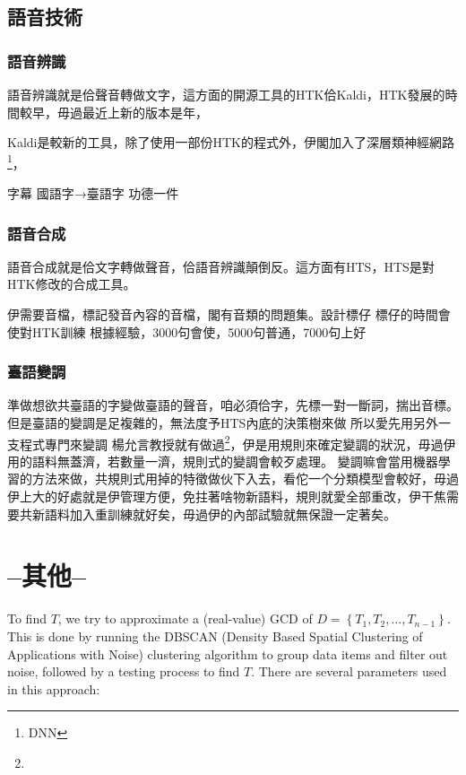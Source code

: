 \documentclass[final,oneside,onecolumn,12pt,a4paper]{book}%
\begin{document}
\section{語音技術}
\label{節：語音技術}
\subsection{語音辨識}
\label{節：語音辨識}
語音辨識就是佮聲音轉做文字，這方面的開源工具的HTK佮Kaldi，HTK發展的時間較早，毋過最近上新的版本是年，

Kaldi是較新的工具，除了使用一部份HTK的程式外，伊閣加入了深層類神經網路\footnote{DNN}，

字幕 國語字→臺語字
功德一件

\subsection{語音合成}
\label{節：語音合成}
語音合成就是佮文字轉做聲音，佮語音辨識顛倒反。這方面有HTS，HTS是對HTK修改的合成工具。

伊需要音檔，標記發音內容的音檔，閣有音類的問題集。設計標仔
標仔的時間會使對HTK訓練
根據經驗，3000句會使，5000句普通，7000句上好

\subsection{臺語變調}
\label{節：臺語變調}
準做想欲共臺語的字變做臺語的聲音，咱必須佮字，先標一對一斷詞，揣出音標。
但是臺語的變調是足複雜的，無法度予HTS內底的決策樹來做
所以愛先用另外一支程式專門來變調
楊允言教授就有做過\footnote{}，伊是用規則來確定變調的狀況，毋過伊用的語料無蓋濟，若數量一濟，規則式的變調會較歹處理。
變調嘛會當用機器學習的方法來做，共規則式用掉的特徵做伙下入去，看佗一个分類模型會較好，毋過伊上大的好處就是伊管理方便，免拄著啥物新語料，規則就愛全部重改，伊干焦需要共新語料加入重訓練就好矣，毋過伊的內部試驗就無保證一定著矣。


\chapter{--其他--}
To find $T$, we try to approximate a (real-value) GCD of $D=\left\{
T_{1},T_{2},...,T_{n-1}\right\}  $. This is done by running the DBSCAN
(Density Based Spatial Clustering of Applications with Noise) clustering
algorithm \cite{Ester1996DBSCAN} to group data items and filter out noise,
followed by a testing process to find $T$. There are several parameters used
in this approach:
\end{document}
